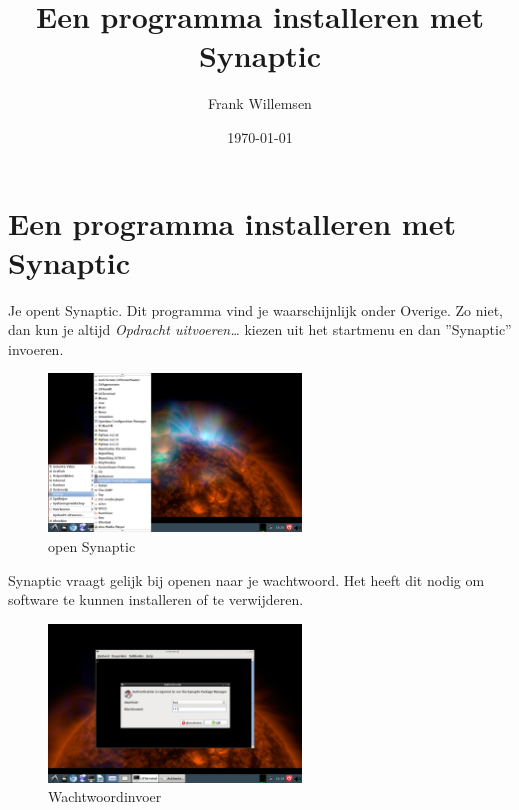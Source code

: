\documentclass[12pt,a4paper]{article}
\begin{document}
\graphicspath{{images/}}
\lstset{language=bash}
\author{Frank Willemsen}
\title{Een programma installeren met Synaptic}
\date{\today}
\maketitle
{}
\section{Een programma installeren met Synaptic}


Je opent Synaptic. Dit programma vind je waarschijnlijk onder Overige. Zo niet, dan kun je altijd \emph{Opdracht uitvoeren\ldots} kiezen uit het startmenu en dan ''Synaptic'' invoeren. 

\begin{figure} [H]
\centering
\includegraphics[width=0.6\textwidth]{plaatje01}
\caption{open Synaptic}
\label{plaatje01}
\end{figure}

Synaptic vraagt gelijk bij openen naar je wachtwoord. Het heeft dit nodig om software te kunnen installeren of te verwijderen.

\begin{figure} [H]
\centering
\includegraphics[width=0.6\textwidth]{plaatje02}
\caption{Wachtwoordinvoer}
\label{plaatje02}
\end{figure}

\clearpage
\end{document}
